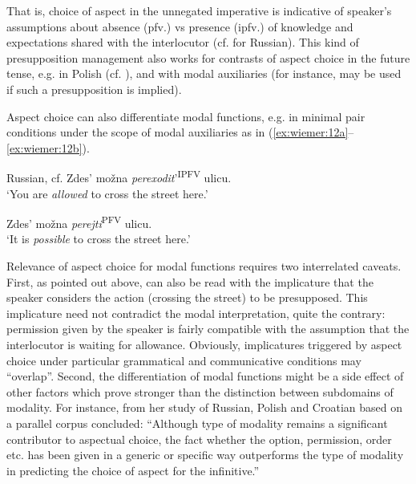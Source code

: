 \documentclass[output=paper]{langscibook}
\begin{document}
That is, choice of aspect in the unnegated imperative is indicative of speaker’s assumptions about absence (pfv.) vs presence (ipfv.) of knowledge and expectations shared with the interlocutor (cf. \citealt[71--80]{Padučeva1996} for Russian). This kind of presupposition management also works for contrasts of aspect choice in the future tense, e.g. in Polish (cf. \citealt[193--199]{Blaszczak2014}), and with modal auxiliaries (for instance,  may be used if such a presupposition is implied). 

Aspect choice can also differentiate modal functions, e.g. in minimal pair conditions under the scope of modal auxiliaries as in (\ref{ex:wiemer:12a}--\ref{ex:wiemer:12b}).

\ea 
{Russian, cf. \citet{Paduceva2008}} 
\ea Zdes’ možna 
    \textit{perexodit}’\textsuperscript{IPFV} ulicu.\\
    ‘You are \textit{allowed} to cross the street here.’\label{ex:wiemer:12a}

\ex \label{ex:wiemer:12b}Zdes’ možna \textit{perejti}\textsuperscript{PFV} ulicu.\\
    ‘It is \textit{possible} to cross the street here.’
    \z\z 
    
\begin{sloppypar}
Relevance of aspect choice for modal functions requires two interrelated caveats. First, as pointed out above,  can also be read with the implicature that the speaker considers the action (crossing the street) to be presupposed. This implicature need not contradict the modal interpretation, quite the contrary: permission given by the speaker is fairly compatible with the assumption that the interlocutor is waiting for allowance. Obviously, implicatures triggered by aspect choice under particular grammatical and communicative conditions may “overlap”. Second, the differentiation of modal functions might be a side effect of other factors which prove stronger than the distinction between subdomains of modality. For instance, from her study of Russian, Polish and Croatian based on a parallel corpus \citet[81]{Divjak2011} concluded: “Although type of modality remains a significant contributor to aspectual choice, the fact whether the option, permission, order etc. has been given in a generic or specific way outperforms the type of modality in predicting the choice of aspect for the infinitive.”
\end{sloppypar}
\end{document}
